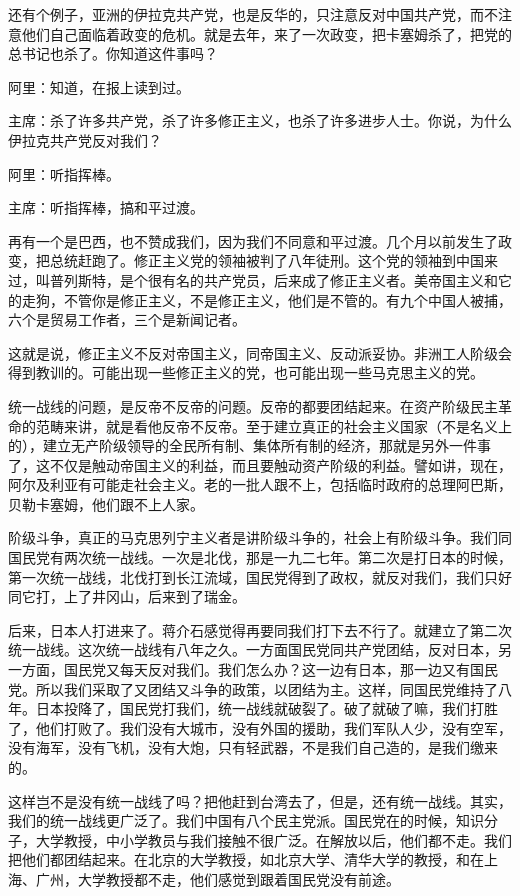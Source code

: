 还有个例子，亚洲的伊拉克共产党，也是反华的，只注意反对中国共产党，而不注意他们自己面临着政变的危机。就是去年，来了一次政变，把卡塞姆杀了，把党的总书记也杀了。你知道这件事吗？

阿里：知道，在报上读到过。

主席：杀了许多共产党，杀了许多修正主义，也杀了许多进步人士。你说，为什么伊拉克共产党反对我们？

阿里：听指挥棒。

主席：听指挥棒，搞和平过渡。

再有一个是巴西，也不赞成我们，因为我们不同意和平过渡。几个月以前发生了政变，把总统赶跑了。修正主义党的领袖被判了八年徒刑。这个党的领袖到中国来过，叫普列斯特，是个很有名的共产党员，后来成了修正主义者。美帝国主义和它的走狗，不管你是修正主义，不是修正主义，他们是不管的。有九个中国人被捕，六个是贸易工作者，三个是新闻记者。

这就是说，修正主义不反对帝国主义，同帝国主义、反动派妥协。非洲工人阶级会得到教训的。可能出现一些修正主义的党，也可能出现一些马克思主义的党。

统一战线的问题，是反帝不反帝的问题。反帝的都要团结起来。在资产阶级民主革命的范畴来讲，就是看他反帝不反帝。至于建立真正的社会主义国家（不是名义上的），建立无产阶级领导的全民所有制、集体所有制的经济，那就是另外一件事了，这不仅是触动帝国主义的利益，而且要触动资产阶级的利益。譬如讲，现在，阿尔及利亚有可能走社会主义。老的一批人跟不上，包括临时政府的总理阿巴斯，贝勒卡塞姆，他们跟不上人家。

阶级斗争，真正的马克思列宁主义者是讲阶级斗争的，社会上有阶级斗争。我们同国民党有两次统一战线。一次是北伐，那是一九二七年。第二次是打日本的时候，第一次统一战线，北伐打到长江流域，国民党得到了政权，就反对我们，我们只好同它打，上了井冈山，后来到了瑞金。

后来，日本人打进来了。蒋介石感觉得再要同我们打下去不行了。就建立了第二次统一战线。这次统一战线有八年之久。一方面国民党同共产党团结，反对日本，另一方面，国民党又每天反对我们。我们怎么办？这一边有日本，那一边又有国民党。所以我们采取了又团结又斗争的政策，以团结为主。这样，同国民党维持了八年。日本投降了，国民党打我们，统一战线就破裂了。破了就破了嘛，我们打胜了，他们打败了。我们没有大城市，没有外国的援助，我们军队人少，没有空军，没有海军，没有飞机，没有大炮，只有轻武器，不是我们自己造的，是我们缴来的。

这样岂不是没有统一战线了吗？把他赶到台湾去了，但是，还有统一战线。其实，我们的统一战线更广泛了。我们中国有八个民主党派。国民党在的时候，知识分子，大学教授，中小学教员与我们接触不很广泛。在解放以后，他们都不走。我们把他们都团结起来。在北京的大学教授，如北京大学、清华大学的教授，和在上海、广州，大学教授都不走，他们感觉到跟着国民党没有前途。

